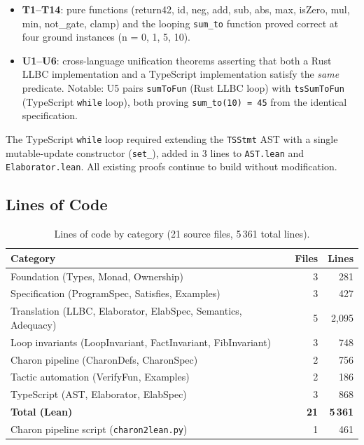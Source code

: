 \begin{itemize}[leftmargin=2em]
  \item \textbf{T1--T14}: pure functions (return42, id, neg, add, sub, abs,
        max, isZero, mul, min, not\_gate, clamp) and the looping
        \texttt{sum\_to} function proved correct at four ground instances
        (n = 0, 1, 5, 10).
  \item \textbf{U1--U6}: cross-language unification theorems asserting that
        both a Rust LLBC implementation and a TypeScript implementation satisfy
        the \emph{same} \ProgramSpec predicate.
        Notable: U5 pairs \texttt{sumToFun} (Rust LLBC loop) with
        \texttt{tsSumToFun} (TypeScript \texttt{while} loop), both
        proving \texttt{sum\_to(10) = 45} from the identical specification.
\end{itemize}

The TypeScript \texttt{while} loop required extending the \texttt{TSStmt}
AST with a single mutable-update constructor (\texttt{set\_}), added in
3 lines to \texttt{AST.lean} and \texttt{Elaborator.lean}.
All existing proofs continue to build without modification.

\subsection{Lines of Code}

\begin{table}[t]
\centering
\caption{Lines of code by category (21 source files, 5\,361 total lines).}
\label{tab:loc}
\small
\begin{tabular}{@{}lrr@{}}
\toprule
\textbf{Category} & \textbf{Files} & \textbf{Lines} \\
\midrule
Foundation (Types, Monad, Ownership)                      & 3  &  281 \\
Specification (ProgramSpec, Satisfies, Examples)          & 3  &  427 \\
Translation (LLBC, Elaborator, ElabSpec, Semantics, Adequacy) & 5 & 2{,}095 \\
Loop invariants (LoopInvariant, FactInvariant, FibInvariant)  & 3 &   748 \\
Charon pipeline (CharonDefs, CharonSpec)                  & 2  &  756 \\
Tactic automation (VerifyFun, Examples)                   & 2  &  186 \\
TypeScript (AST, Elaborator, ElabSpec)                    & 3  &  868 \\
\midrule
\textbf{Total (Lean)}                                     & \textbf{21} & \textbf{5\,361} \\
Charon pipeline script (\texttt{charon2lean.py})          & 1  &  461 \\
\bottomrule
\end{tabular}
\end{table}

